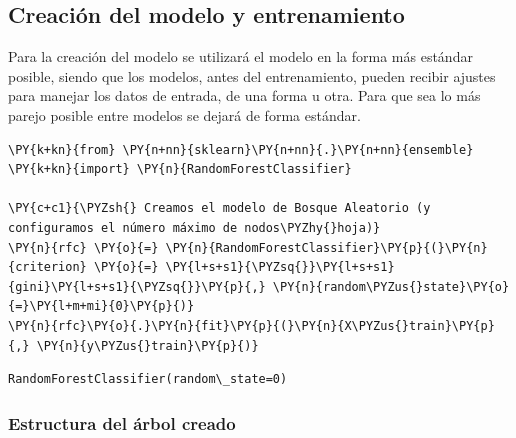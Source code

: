     \hypertarget{creaciuxf3n-del-modelo-y-entrenamiento}{%
\subsection{Creación del modelo y
entrenamiento}\label{creaciuxf3n-del-modelo-y-entrenamiento}}

Para la creación del modelo se utilizará el modelo en la forma más
estándar posible, siendo que los modelos, antes del entrenamiento,
pueden recibir ajustes para manejar los datos de entrada, de una forma u
otra. Para que sea lo más parejo posible entre modelos se dejará de
forma estándar.

    \begin{tcolorbox}[breakable, size=fbox, boxrule=1pt, pad at break*=1mm,colback=cellbackground, colframe=cellborder]
\begin{Verbatim}[commandchars=\\\{\}]
\PY{k+kn}{from} \PY{n+nn}{sklearn}\PY{n+nn}{.}\PY{n+nn}{ensemble} \PY{k+kn}{import} \PY{n}{RandomForestClassifier}

\PY{c+c1}{\PYZsh{} Creamos el modelo de Bosque Aleatorio (y configuramos el número máximo de nodos\PYZhy{}hoja)}
\PY{n}{rfc} \PY{o}{=} \PY{n}{RandomForestClassifier}\PY{p}{(}\PY{n}{criterion} \PY{o}{=} \PY{l+s+s1}{\PYZsq{}}\PY{l+s+s1}{gini}\PY{l+s+s1}{\PYZsq{}}\PY{p}{,} \PY{n}{random\PYZus{}state}\PY{o}{=}\PY{l+m+mi}{0}\PY{p}{)}
\PY{n}{rfc}\PY{o}{.}\PY{n}{fit}\PY{p}{(}\PY{n}{X\PYZus{}train}\PY{p}{,} \PY{n}{y\PYZus{}train}\PY{p}{)}
\end{Verbatim}
\end{tcolorbox}

            \begin{tcolorbox}[breakable, size=fbox, boxrule=.5pt, pad at break*=1mm, opacityfill=0]
\begin{Verbatim}[commandchars=\\\{\}]
RandomForestClassifier(random\_state=0)
\end{Verbatim}
\end{tcolorbox}
        
    \hypertarget{estructura-del-uxe1rbol-creado}{%
\subsubsection{Estructura del árbol
creado}\label{estructura-del-uxe1rbol-creado}}

